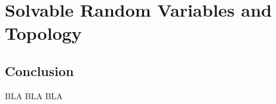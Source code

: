 

\chapter{Solvable Random Variables and Topology}












\section{Conclusion}

BLA BLA BLA



